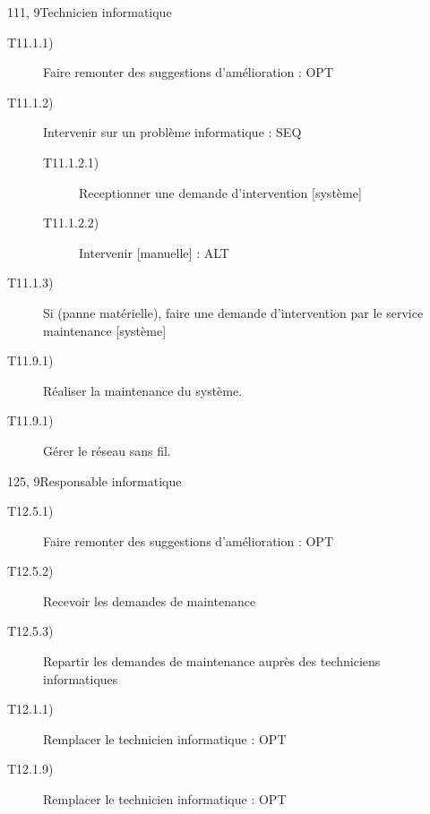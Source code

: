 \dta
{11}{1, 9}{Technicien informatique}
{
\begin{description}
	\item [T11.1.1)] Faire remonter des suggestions d’amélioration : OPT	
	\item [T11.1.2)] Intervenir sur un problème informatique : SEQ
	\begin{description}
		\item [T11.1.2.1)] Receptionner une demande d’intervention [système]
		\item [T11.1.2.2)] Intervenir [manuelle] : ALT
	\end{description}
	\item [T11.1.3)] Si (panne matérielle), faire une demande d’intervention par le service maintenance [système]

	\item [T11.9.1)] Réaliser la maintenance du système.
	\item [T11.9.1)] Gérer le réseau sans fil.
\end{description}
}

\dta
{12}{5, 9}{Responsable informatique}
{
\begin{description}
	\item [T12.5.1)] Faire remonter des suggestions d’amélioration : OPT
	\item [T12.5.2)] Recevoir les demandes de maintenance
	\item [T12.5.3)] Repartir les demandes de maintenance auprès des techniciens informatiques

	\item [T12.1.1)] Remplacer le technicien informatique : OPT 
	\item [T12.1.9)] Remplacer le technicien informatique : OPT 
\end{description}
}
